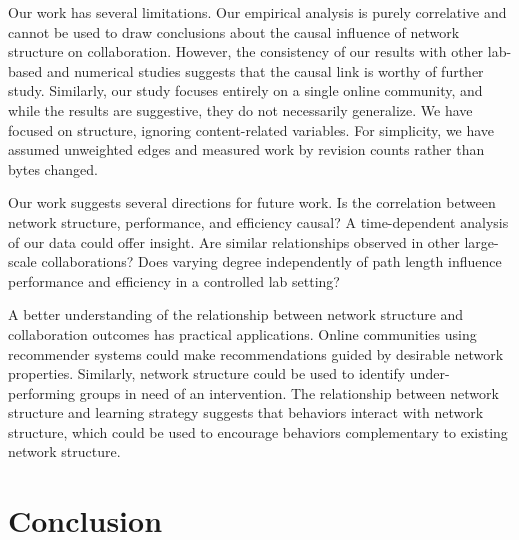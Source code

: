 \documentclass[letterpaper,twocolumn,10pt]{article}
\newcommand{\+}{\phantom{-}}
\begin{document}
Our work has several limitations.
Our empirical analysis is purely correlative and cannot be used to draw
conclusions about the causal influence of network structure on collaboration.
However, the consistency of our results with other lab-based and numerical studies
suggests that the causal link is worthy of further study.
Similarly, our study focuses entirely on a single online community,
and while the results are suggestive, they do not necessarily generalize.
We have focused on structure, ignoring content-related variables.
For simplicity, we have assumed unweighted edges and
measured work by revision counts rather than bytes changed.

Our work suggests several directions for future work.
Is the correlation between network structure, performance, and efficiency causal?
A time-dependent analysis of our data could offer insight.
Are similar relationships observed in other large-scale collaborations?
Does varying degree independently of path length influence
performance and efficiency in a controlled lab setting?

A better understanding of the relationship between network structure and collaboration
outcomes has practical applications.
Online communities using recommender systems could make recommendations guided by desirable network properties.
Similarly, network structure could be used to identify under-performing
groups in need of an intervention.
The relationship between network structure and learning strategy suggests that
behaviors interact with network structure,
which could be used to encourage behaviors complementary to existing network
structure.

\section{Conclusion}
\label{sec:conclusion}
\end{document}
